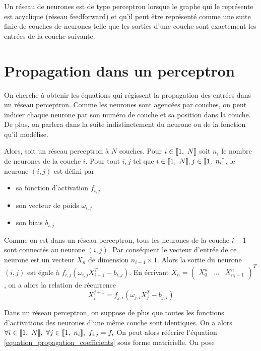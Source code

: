 \begin{definition}[Perceptron]
Un réseau de neurones est de type perceptron lorsque le graphe qui le représente est acyclique (réseau feedforward) et qu'il peut être représenté comme une suite finie de couches de neurones telle que les sorties d'une couche sont exactement les entrées de la couche suivante.
\end{definition} 

\section{Propagation dans un perceptron}

On cherche à obtenir les équations qui régissent la propagation des entrées dans un réseau perceptron. Comme les neurones sont agencées par couches, on peut indicer chaque neurone par son numéro de couche et sa position dans la couche. De plus, on parlera dans la suite indistinctement du neurone ou de la fonction qu'il modélise. 

Alors, soit un réseau perceptron à $N$ couches. Pour $i \in \llbracket 1,\ N \rrbracket$ soit $n_i$ le nombre de neurones de la couche $i$. Pour tout $i,j $ tel que $i \in \llbracket 1,\ N \rrbracket, j \in \llbracket 1,\ n_i \rrbracket$, le neurone $(i,j)$ est défini par 
\begin{itemize}
  \item sa fonction d'activation $f_{i,j}$ 
  \item son vecteur de poids $\omega_{i,j}$
  \item son biais $b_{i,j}$
\end{itemize}

Comme on est dans un réseau perceptron, tous les neurones de la couche $i-1$ sont connectés au neurone $(i,j)$. Par conséquent le vecteur d'entrée de ce neurone est un vecteur $X_n$ de dimension $n_{i-1} \times 1$. Alors la sortie du neurone $(i,j)$ est égale à $f_{i,j}(\omega_{i,j}X_{i-1}^T - b_{i,j})$. En écrivant $X_n = \begin{pmatrix}X_0^n & ... & X_{n_i-1}^n\end{pmatrix}^T$, on a alors la relation de récurrence 
\begin{equation}
  X_i^{j+1} = f_{j,i}(\omega_{j,i}X_j^T - b_{j,i})
  \label{equation_propagation_coefficients}
\end{equation}

Dans un réseau perceptron, on suppose de plus que toutes les fonctions d'activations des neurones d'une même couche sont identiques. On a alors $\forall i \in \brackets{1,\ N},\ \forall j \in \brackets{1,\ n_i},\ f_{i,j} = f_i$
On peut alors réécrire l'équation \eqref{equation_propagation_coefficients} sous forme matricielle. On pose

